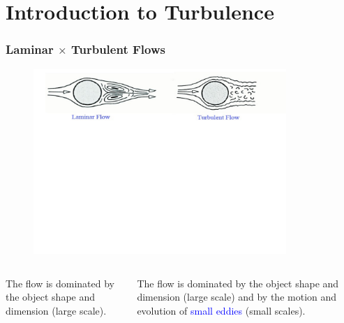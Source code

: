 \documentclass[10pt,compress,handout,ignorenonframetext]{beamer}
\newcommand{\blue}{\textcolor{blue}}
\begin{document}
\section{Introduction to Turbulence}

\begin{frame}
 \frametitle{Laminar $\times$ Turbulent Flows}
   \begin{figure}%
    \begin{center}
     \includegraphics[width=9.cm, height=7cm, clip]{./Figs/Transition2Turbulence2b}
    \end{center}
   \end{figure}    
  \vspace{-5cm}
  \begin{columns}
    \begin{column}[l]{0.5\linewidth}
        The flow is dominated by the object shape and dimension (large scale).
    \end{column}
    \begin{column}[l]{0.5\linewidth}
      The flow is dominated by the object shape and dimension (large scale) and by the motion and evolution of \blue{small eddies} (small scales).
    \end{column}
  \end{columns}

\end{frame}
\end{document}
